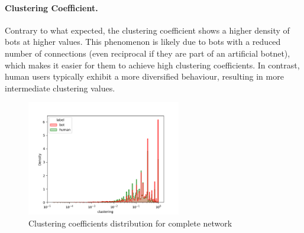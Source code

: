 \documentclass[12pt, a4paper]{article}
\begin{document}
		\paragraph{Clustering Coefficient.} Contrary to what expected, the clustering coefficient shows a higher density of bots at higher values. This phenomenon is likely due to bots with a reduced number of connections (even reciprocal if they are part of an artificial botnet), which makes it easier for them to achieve high clustering coefficients. In contrast, human users typically exhibit a more diversified behaviour, resulting in more intermediate clustering values.
        \begin{figure}[H]
            \centering
            \includegraphics[width=0.6\textwidth]{results/complete_clustering.png}
            \caption{Clustering coefficients distribution for complete network}
        \end{figure}
\end{document}
